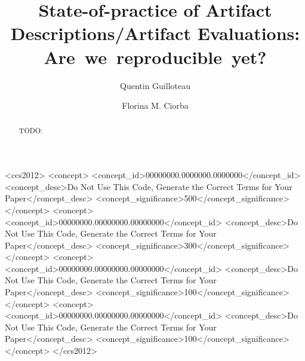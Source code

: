 \documentclass[sigconf,natbib=false]{acmart}
\newcommand{\ad}{Artifact Description}
\newcommand{\aeval}{Artifact Evaluation}
\newcommand{\todo}[1]{{\color{red}TODO: #1}}
\begin{document}
\title{State-of-practice of \ad s/\aeval s: Are~we~reproducible~yet?}

\author{Quentin Guilloteau}\author{Florina M. Ciorba}


\begin{abstract}
  \todo{}
\end{abstract}

\begin{CCSXML}
<ccs2012>
 <concept>
  <concept_id>00000000.0000000.0000000</concept_id>
  <concept_desc>Do Not Use This Code, Generate the Correct Terms for Your Paper</concept_desc>
  <concept_significance>500</concept_significance>
 </concept>
 <concept>
  <concept_id>00000000.00000000.00000000</concept_id>
  <concept_desc>Do Not Use This Code, Generate the Correct Terms for Your Paper</concept_desc>
  <concept_significance>300</concept_significance>
 </concept>
 <concept>
  <concept_id>00000000.00000000.00000000</concept_id>
  <concept_desc>Do Not Use This Code, Generate the Correct Terms for Your Paper</concept_desc>
  <concept_significance>100</concept_significance>
 </concept>
 <concept>
  <concept_id>00000000.00000000.00000000</concept_id>
  <concept_desc>Do Not Use This Code, Generate the Correct Terms for Your Paper</concept_desc>
  <concept_significance>100</concept_significance>
 </concept>
</ccs2012>
\end{CCSXML}



\end{document}
